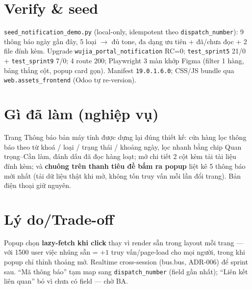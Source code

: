 \section{Verify \& seed}

\texttt{seed\_notification\_demo.py} (local-only, idempotent theo \texttt{dispatch\_number}): 9 thông báo
ngày gần đây, 5 loại $\rightarrow$ đủ tone, đa dạng ưu tiên + đã/chưa đọc + 2 file đính kèm. Upgrade
\texttt{wujia\_portal\_notification} RC=0; \texttt{test\_sprint5} 21/0 + \texttt{test\_sprint9} 7/0;
4 route 200; Playwright 3 màn khớp Figma (filter 1 hàng, bảng thẳng cột, popup card gọn). Manifest
\texttt{19.0.1.6.0}; CSS/JS bundle qua \texttt{web.assets\_frontend} (Odoo tự re-version).

\section{Gì đã làm (nghiệp vụ)}

Trang Thông báo bản máy tính được dựng lại đúng thiết kế: cửa hàng lọc thông báo theo từ khoá / loại /
trạng thái / khoảng ngày, lọc nhanh bằng chip Quan trọng--Cần làm, đánh dấu đã đọc hàng loạt; mở chi
tiết 2 cột kèm tải tài liệu đính kèm; và \textbf{chuông trên thanh tiêu đề bấm ra popup} liệt kê 5 thông
báo mới nhất (tải dữ liệu thật khi mở, không tốn truy vấn mỗi lần đổi trang). Bản điện thoại giữ nguyên.

\section{Lý do/Trade-off}

Popup chọn \textbf{lazy-fetch khi click} thay vì render sẵn trong layout mỗi trang --- với 1500 user
việc nhúng sẵn = $+1$ truy vấn/page-load cho mọi người, trong khi popup chỉ thỉnh thoảng mở. Realtime
cross-session (bus.bus, ADR-006) để sprint sau. ``Mã thông báo'' tạm map sang \texttt{dispatch\_number}
(field gần nhất); ``Liên kết liên quan'' bỏ vì chưa có field --- chờ BA.
